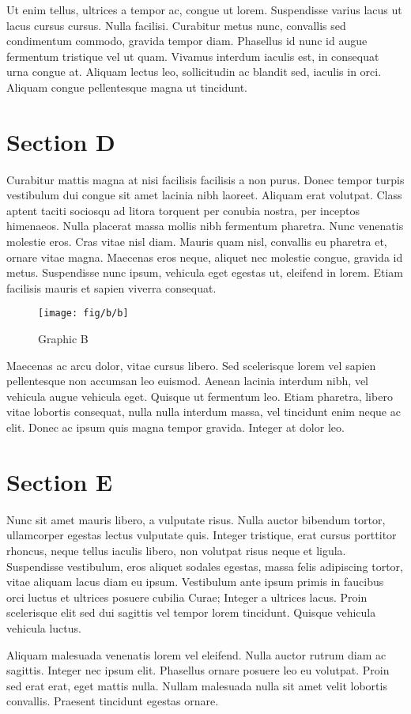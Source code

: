 Ut enim tellus, ultrices a tempor ac, congue ut lorem. Suspendisse varius lacus ut lacus cursus cursus. Nulla facilisi. Curabitur metus nunc, convallis sed condimentum commodo, gravida tempor diam. Phasellus id nunc id augue fermentum tristique vel ut quam. Vivamus interdum iaculis est, in consequat urna congue at. Aliquam lectus leo, sollicitudin ac blandit sed, iaculis in orci. Aliquam congue pellentesque magna ut tincidunt.

\section{Section D}
Curabitur mattis magna at nisi facilisis facilisis a non purus. Donec tempor turpis vestibulum dui congue sit amet lacinia nibh laoreet. Aliquam erat volutpat. Class aptent taciti sociosqu ad litora torquent per conubia nostra, per inceptos himenaeos. Nulla placerat massa mollis nibh fermentum pharetra. Nunc venenatis molestie eros. Cras vitae nisl diam. Mauris quam nisl, convallis eu pharetra et, ornare vitae magna. Maecenas eros neque, aliquet nec molestie congue, gravida id metus. Suspendisse nunc ipsum, vehicula eget egestas ut, eleifend in lorem. Etiam facilisis mauris et sapien viverra consequat.

\begin{figure}[h]
\begin{centering}
    \texttt{[image: fig/b/b]}
    \caption{Graphic B}
\end{centering}
\end{figure}

Maecenas ac arcu dolor, vitae cursus libero. Sed scelerisque lorem vel sapien pellentesque non accumsan leo euismod. Aenean lacinia interdum nibh, vel vehicula augue vehicula eget. Quisque ut fermentum leo. Etiam pharetra, libero vitae lobortis consequat, nulla nulla interdum massa, vel tincidunt enim neque ac elit. Donec ac ipsum quis magna tempor gravida. Integer at dolor leo.

\section{Section E}
Nunc sit amet mauris libero, a vulputate risus. Nulla auctor bibendum tortor, ullamcorper egestas lectus vulputate quis. Integer tristique, erat cursus porttitor rhoncus, neque tellus iaculis libero, non volutpat risus neque et ligula. Suspendisse vestibulum, eros aliquet sodales egestas, massa felis adipiscing tortor, vitae aliquam lacus diam eu ipsum. Vestibulum ante ipsum primis in faucibus orci luctus et ultrices posuere cubilia Curae; Integer a ultrices lacus. Proin scelerisque elit sed dui sagittis vel tempor lorem tincidunt. Quisque vehicula vehicula luctus.

Aliquam malesuada venenatis lorem vel eleifend. Nulla auctor rutrum diam ac sagittis. Integer nec ipsum elit. Phasellus ornare posuere leo eu volutpat. Proin sed erat erat, eget mattis nulla. Nullam malesuada nulla sit amet velit lobortis convallis. Praesent tincidunt egestas ornare.
